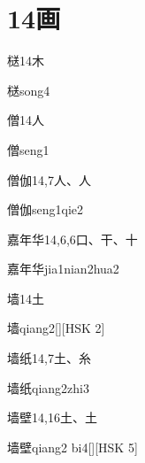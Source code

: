 
\section*{14画}

\begin{entry}{㮸}{14}{⽊}
  \begin{phonetics}{㮸}{song4}
  \end{phonetics}
\end{entry}

\begin{entry}{僧}{14}{⼈}
  \begin{phonetics}{僧}{seng1}
  \end{phonetics}
\end{entry}

\begin{entry}{僧伽}{14,7}{⼈、⼈}
  \begin{phonetics}{僧伽}{seng1qie2}
  \end{phonetics}
\end{entry}

\begin{entry}{嘉年华}{14,6,6}{⼝、⼲、⼗}
  \begin{phonetics}{嘉年华}{jia1nian2hua2}
  \end{phonetics}
\end{entry}

\begin{entry}{墙}{14}{⼟}
  \begin{phonetics}{墙}{qiang2}[][HSK 2]
  \end{phonetics}
\end{entry}

\begin{entry}{墙纸}{14,7}{⼟、⽷}
  \begin{phonetics}{墙纸}{qiang2zhi3}
  \end{phonetics}
\end{entry}

\begin{entry}{墙壁}{14,16}{⼟、⼟}
  \begin{phonetics}{墙壁}{qiang2 bi4}[][HSK 5]
  \end{phonetics}
\end{entry}

